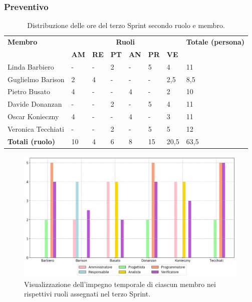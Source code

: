 \subsubsection{Preventivo}
\begin{table}[ht!]
    \centering
    \begin{tabular}{p{4cm} p{1cm} p{1cm} p{1cm} p{1cm} p{1cm} p{1cm} p{3cm}}
        \toprule
        \textbf{Membro} & \multicolumn{6}{c}{\textbf{Ruoli}} & \textbf{Totale (persona)}\\
		& \textbf{AM} & \textbf{RE} & \textbf{PT} & \textbf{AN} & \textbf{PR} & \textbf{VE}\\
		\midrule
        Linda Barbiero       & -   & -   & 2   & -   & 5   & 4   & 11 \\
        Guglielmo Barison    & 2   & 4   & -   & -   & -   & 2,5 & 8,5 \\
        Pietro Busato        & 4   & -   & -   & 4   & -   & 2   & 10 \\
        Davide Donanzan      & -   & -   & 2   & -   & 5   & 4   & 11 \\
        Oscar Konieczny      & 4   & -   & -   & 4   & -   & 3   & 11 \\
        Veronica Tecchiati   & -   & -   & 2   & -   & 5   & 5   & 12 \\
        \bottomrule
        \textbf{Totali (ruolo)} & 10 & 4 & 6 & 8 & 15 & 20,5 & 63,5 \\
    \end{tabular}
    \caption{Distribuzione delle ore del terzo Sprint secondo ruolo e membro.}
    \label{table:Distribuzione delle ore del terzo Sprint secondo ruolo e membro}
\end{table}
\begin{figure}[ht!]
    \centering
    \includegraphics[width=15cm]{./asset/istogramma_periodo_3.png}
    \caption{Visualizzazione dell’impegno temporale di ciascun membro nei rispettivi ruoli assegnati
    nel terzo Sprint.}
    \label{figure:Visualizzazione dell’impegno temporale di ciascun membro nei rispettivi ruoli
    assegnati nel terzo Sprint}
\end{figure}
